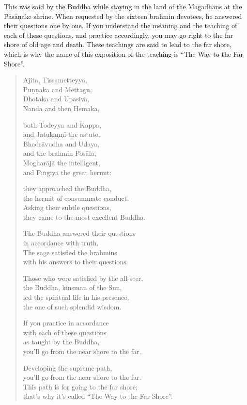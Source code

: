 \documentclass[12pt,openany]{book}%
\begin{document}
This was said by the Buddha while staying in the land of the Magadhans at the \textsanskrit{Pāsāṇake} shrine. When requested by the sixteen brahmin devotees, he answered their questions one by one. If you understand the meaning and the teaching of each of these questions, and practice accordingly, you may go right to the far shore of old age and death. These teachings are said to lead to the far shore, which is why the name of this exposition of the teaching is “The Way to the Far Shore”. 

\begin{verse}%
Ajita, Tissametteyya, \\
\textsanskrit{Puṇṇaka} and \textsanskrit{Mettagū}, \\
Dhotaka and Upasiva, \\
Nanda and then Hemaka, 

both Todeyya and Kappa, \\
and \textsanskrit{Jatukaṇṇī} the astute, \\
\textsanskrit{Bhadrāvudha} and Udaya, \\
and the brahmin \textsanskrit{Posāla}, \\
\textsanskrit{Mogharājā} the intelligent, \\
and \textsanskrit{Piṅgiya} the great hermit: 

they approached the Buddha, \\
the hermit of consummate conduct. \\
Asking their subtle questions, \\
they came to the most excellent Buddha. 

The Buddha answered their questions \\
in accordance with truth. \\
The sage satisfied the brahmins \\
with his answers to their questions. 

Those who were satisfied by the all-seer, \\
the Buddha, kinsman of the Sun, \\
led the spiritual life in his presence, \\
the one of such splendid wisdom. 

If you practice in accordance \\
with each of these questions \\
as taught by the Buddha, \\
you’ll go from the near shore to the far. 

Developing the supreme path, \\
you’ll go from the near shore to the far. \\
This path is for going to the far shore; \\
that’s why it’s called “The Way to the Far Shore”. 

%
\end{verse}
\end{document}
